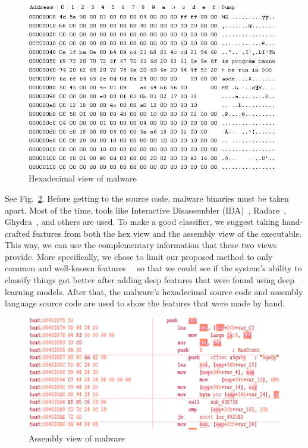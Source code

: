 \documentclass[pdflatex,sn-mathphys]{sn-jnl}%
\begin{document}
\begin{figure}[tb]
	\centering
	\includegraphics[width=1.0\textwidth]{hex.png}
	\caption{Hexadecimal view of malware}
	\label{hexview}
\end{figure}

See Fig.~\ref{asmview}. Before getting to the source code, malware binaries must be taken apart. Most of the time, tools like Interactive Disassembler (IDA)~\cite{78}, Radare~\cite{79}, Ghydra~\cite{80}, and others are used. To make a good classifier, we suggest taking hand-crafted features from both the hex view and the assembly view of the executable. This way, we can use the complementary information that these two views provide. More specifically, we chose to limit our proposed method to only common and well-known features~\cite{24}~\cite{77} so that we could see if the system's ability to classify things got better after adding deep features that were found using deep learning models. After that, the malware's hexadecimal source code and assembly language source code are used to show the features that were made by hand.
\color{black}
\begin{figure}[tb]
	\centering
	\includegraphics[width=1.0\textwidth]{assembly.png}
	\caption{Assembly view of malware}
	\label{asmview}
\end{figure}
\end{document}
